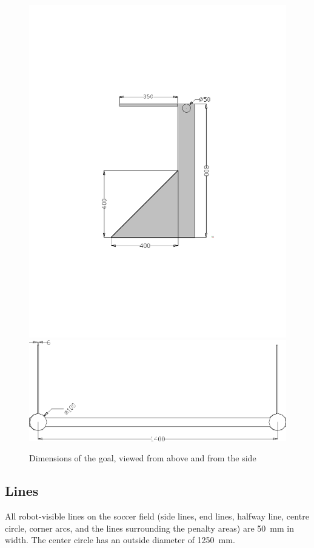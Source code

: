 \documentclass[12pt]{article}
\begin{document}
\begin{figure}[htp]
\begin{center}
\leavevmode
\includegraphics[width=0.8\columnwidth]{figs/goals2010_2.png}\\
\includegraphics[width=0.8\columnwidth]{figs/goal_with_dims_top.png}
\caption{Dimensions of the goal, viewed from above and from the side}
\label{fig:goal_dimensions}
\end{center}
\end{figure}

\subsection{Lines}\label{sec:field_lines}

All robot-visible lines on the soccer field (side lines, end lines, halfway line, centre circle, corner arcs, and the lines surrounding the penalty areas) are 50~mm in width. The center circle has an outside diameter of 1250~mm.
\end{document}
